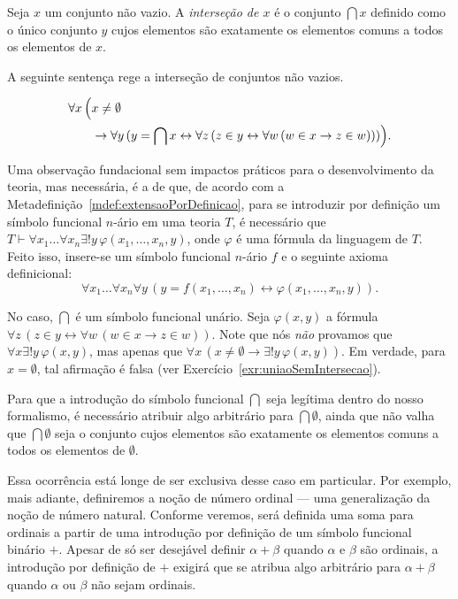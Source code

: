 \begin{definition}[$\BST$]\label{def:intersecaoDeConjuntos}
    Seja $x$ um conjunto não vazio.
    A \emph{interseção de $x$} é o conjunto $\bigcap x$ definido como o único conjunto $y$ cujos elementos são exatamente os elementos comuns a todos os elementos de $x$.

    A seguinte sentença rege a interseção de conjuntos não vazios.

    \[
        \begin{aligned}
            \forall x\, \Bigl(
                &x \neq \emptyset \\
                &\rightarrow \forall y\, (y = \bigcap x \leftrightarrow \forall z\, (z \in y \leftrightarrow \forall w\, (w \in x \rightarrow z \in w)))
            \Bigr).
        \end{aligned}
    \]
\end{definition}

Uma observação fundacional sem impactos práticos para o desenvolvimento da teoria, mas necessária, é a de que, de acordo com a Metadefinição~\ref{mdef:extensaoPorDefinicao}, para se introduzir por definição um símbolo funcional $n$-ário em uma teoria $T$, é necessário que $T\vdash\forall x_1 \ldots \forall x_n \exists! y\, \varphi(x_1, \ldots, x_n, y)$, onde $\varphi$ é uma fórmula da linguagem de $T$.
Feito isso, insere-se um símbolo funcional $n$-ário $f$ e o seguinte axioma definicional:
\[
\forall x_1 \ldots \forall x_n \forall y\, (y = f(x_1, \ldots, x_n) \leftrightarrow \varphi(x_1, \ldots, x_n, y)).
\]

No caso, $\bigcap$ é um símbolo funcional unário.
Seja $\varphi(x, y)$ a fórmula $\forall z\, (z \in y \leftrightarrow \forall w\, (w \in x \rightarrow z \in w))$.
Note que nós \emph{não} provamos que $\forall x \exists! y\, \varphi(x, y)$, mas apenas que $\forall x\, (x \neq \emptyset \rightarrow \exists! y\, \varphi(x, y))$.
Em verdade, para $x=\emptyset$, tal afirmação é falsa (ver Exercício~\ref{exr:uniaoSemIntersecao}).

Para que a introdução do símbolo funcional $\bigcap$ seja legítima dentro do nosso formalismo, é necessário atribuir algo arbitrário para $\bigcap \emptyset$, ainda que não valha que $\bigcap \emptyset$ seja o conjunto cujos elementos são exatamente os elementos comuns a todos os elementos de $\emptyset$.

Essa ocorrência está longe de ser exclusiva desse caso em particular.
Por exemplo, mais adiante, definiremos a noção de número ordinal --- uma generalização da noção de número natural.
Conforme veremos, será definida uma soma para ordinais a partir de uma introdução por definição de um símbolo funcional binário $+$.
Apesar de só ser desejável definir $\alpha+\beta$ quando $\alpha$ e $\beta$ são ordinais, a introdução por definição de $+$ exigirá que se atribua algo arbitrário para $\alpha+\beta$ quando $\alpha$ ou $\beta$ não sejam ordinais.

